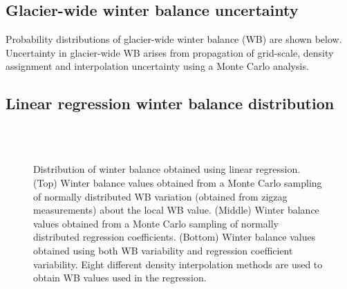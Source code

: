 \documentclass{sfuthesis}
\begin{document}
\begin{appendices}

\chapter{Glacier-wide winter balance uncertainty}

Probability distributions of glacier-wide winter balance (WB) are shown below. Uncertainty in glacier-wide WB arises from propagation of grid-scale, density assignment and interpolation uncertainty using a Monte Carlo analysis.

\pagebreak
\section{Linear regression winter balance distribution}

\begin{figure}[b!]
	\centering
	\\%
	\\%
	\caption[]{Distribution of winter balance obtained using linear regression. (Top) Winter balance values obtained from a Monte Carlo sampling of normally distributed WB variation (obtained from zigzag measurements) about the local WB value. (Middle) Winter balance  values obtained from a Monte Carlo sampling of normally distributed regression coefficients. (Bottom) Winter balance  values obtained using both WB variability and regression coefficient variability. Eight different density interpolation methods are used to obtain WB values used in the regression.}
	\label{fig:WSMB_LR_allDensity}
\end{figure}



\end{appendices}
\end{document}
